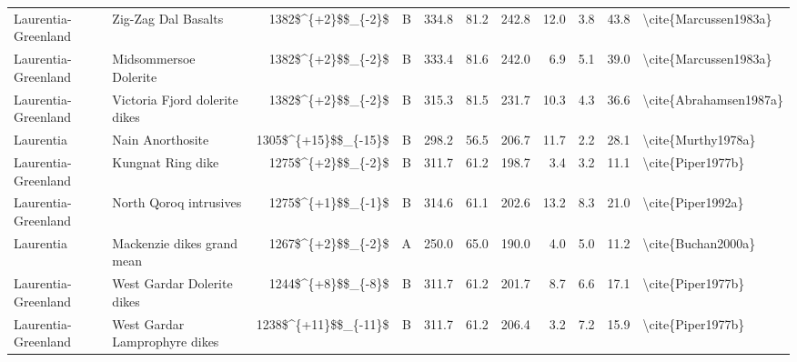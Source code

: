 \begin{longtable}{p{1 in}p{1 in}rrrrrrrr}
           Laurentia-Greenland &                              Zig-Zag Dal Basalts &     1382\$\textasciicircum \{+2\}\$\$\_\{-2\}\$ &      B &     334.8 &      81.2 & 242.8 &  12.0 &       3.8 &        43.8 &                              \textbackslash cite\{Marcussen1983a\} \\
           Laurentia-Greenland &                            Midsommersoe Dolerite &     1382\$\textasciicircum \{+2\}\$\$\_\{-2\}\$ &      B &     333.4 &      81.6 & 242.0 &   6.9 &       5.1 &        39.0 &                              \textbackslash cite\{Marcussen1983a\} \\
           Laurentia-Greenland &                    Victoria Fjord dolerite dikes &     1382\$\textasciicircum \{+2\}\$\$\_\{-2\}\$ &      B &     315.3 &      81.5 & 231.7 &  10.3 &       4.3 &        36.6 &                             \textbackslash cite\{Abrahamsen1987a\} \\
                     Laurentia &                                 Nain Anorthosite &   1305\$\textasciicircum \{+15\}\$\$\_\{-15\}\$ &      B &     298.2 &      56.5 & 206.7 &  11.7 &       2.2 &        28.1 &                                 \textbackslash cite\{Murthy1978a\} \\
           Laurentia-Greenland &                                Kungnat Ring dike &     1275\$\textasciicircum \{+2\}\$\$\_\{-2\}\$ &      B &     311.7 &      61.2 & 198.7 &   3.4 &       3.2 &        11.1 &                                  \textbackslash cite\{Piper1977b\} \\
           Laurentia-Greenland &                           North Qoroq intrusives &     1275\$\textasciicircum \{+1\}\$\$\_\{-1\}\$ &      B &     314.6 &      61.1 & 202.6 &  13.2 &       8.3 &        21.0 &                                  \textbackslash cite\{Piper1992a\} \\
                     Laurentia &                       Mackenzie dikes grand mean &     1267\$\textasciicircum \{+2\}\$\$\_\{-2\}\$ &      A &     250.0 &      65.0 & 190.0 &   4.0 &       5.0 &        11.2 &                                 \textbackslash cite\{Buchan2000a\} \\
           Laurentia-Greenland &                       West Gardar Dolerite dikes &     1244\$\textasciicircum \{+8\}\$\$\_\{-8\}\$ &      B &     311.7 &      61.2 & 201.7 &   8.7 &       6.6 &        17.1 &                                  \textbackslash cite\{Piper1977b\} \\
           Laurentia-Greenland &                    West Gardar Lamprophyre dikes &   1238\$\textasciicircum \{+11\}\$\$\_\{-11\}\$ &      B &     311.7 &      61.2 & 206.4 &   3.2 &       7.2 &        15.9 &                                  \textbackslash cite\{Piper1977b\} \\

\end{longtable}

